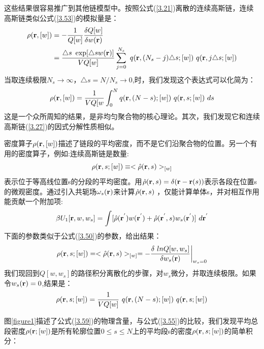 这些结果很容易推广到其他链模型中。按照公式(\ref{3.21})离散的连续高斯链，连续高斯链类似公式(\ref{3.53})的模拟量是：
\begin{equation}\label{3.54}
\begin{aligned}
\rho(\mathbf{r},[w])&=-\frac{1}{Q[w]}\frac{\delta Q[w]}{\delta w(\mathbf{r})}\\ &=\frac{\triangle s ~\exp[\triangle sw(\mathbf{r})]}{VQ[w]}\sum_{j=0}^{N_s}~q(\mathbf{r},(N_s-j)\triangle s;[w])~q(\mathbf{r},j\triangle s;[w])
\end{aligned}
\end{equation}
当取连续极限$N_s\to \infty$，$\triangle s=N/N_s\to 0$,时，我们发现这个表达式可以化简为：
\begin{equation}\label{3.55}
\rho(\mathbf{r},[w])=\frac{1}{VQ[w}\int_{0}^{N}q(\mathbf{r},(N-s);[w])~q(\mathbf{r},s;[w])~ds
\end{equation}
这是一个众所周知的结果，是非均匀聚合物的核心理论。其次，我们发现它和连续高斯链(\ref{3.27})的因式分解性质相似。

密度算子$\rho(\mathbf{r},[w])$描述了链段的平均密度，而不是它们沿聚合物的位置。另一个有用的密度算子，例如:连续高斯链是数量:
\begin{equation}\label{3.56}
\rho(\mathbf{r},s;[w])\equiv <\hat{\rho}(\mathbf{r},s)>_{[w]}
\end{equation}
表示位于等高线位置s的分段的平均密度。用$\hat{\rho}(\mathbf{r},s)=\delta(\mathbf{r}-\mathbf{r}(s))$表示各段在位置s的微观密度。通过引入共轭场$\omega_s(\mathbf{r})$来计算$\hat{\rho}(\mathbf{r},s)$
，仅能计算单体s，并对相互作用能贡献一个附加项:
\begin{equation}\label{3.57}
\beta U_1[\mathbf{r},w ,w_s]=\int [\hat{\rho}(\mathbf{r}^{'})w (\mathbf{r}^{'})+\hat{\rho}(\mathbf{r}^{'},s)w_s(\mathbf{r}^{'})]~d\mathbf{r}^{'}
\end{equation}
下面的参数类似于公式(\ref{3.50})的参数，给出结果：
\begin{equation}\label{3.58}
\rho(\mathbf{r},s;[w])=<\hat{\rho}(\mathbf{r},s)>_{[w]}
=-\frac{\delta~lnQ[w,w_s]}{\delta w_s(\mathbf{r})} \bigg |_{w_s=0}
\end{equation}
我们现回到$Q[w,w_s]$的路径积分离散化的步骤，对$w_s$微分，并取连续极限。如果令$w_s(\mathbf{r})=0$,结果是：
\begin{equation}\label{3.59}
\rho(\mathbf{r},s;[w])=\frac{1}{VQ[w]}~q(\mathbf{r},(N-s);[w])~q(\mathbf{r},s;[w])
\end{equation}

图\ref{figure1}描述了公式(\ref{3.59})的物理含量，与公式(\ref{3.55})的比较，我们发现平均总段密度$\rho(\mathbf{r};[w])$是所有轮廓位置$0\le s\le N$上的平均段s的密度$\rho(\mathbf{r},s;[w])$的简单积分：

